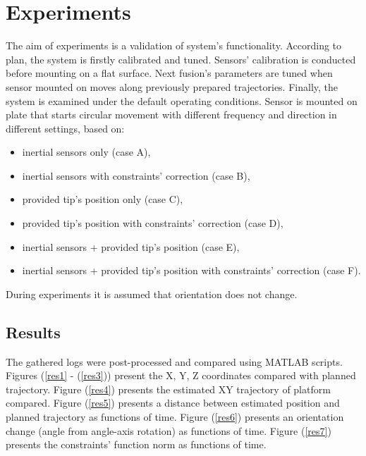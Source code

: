 \chapter{Experiments}

The aim of experiments is a validation of system's functionality. According to plan, the system is firstly calibrated and tuned. Sensors' calibration is conducted before mounting on a flat surface. Next fusion's parameters are tuned when sensor mounted on  moves along previously prepared trajectories. Finally, the system is examined under the default operating conditions. Sensor is mounted on plate that starts circular movement with different frequency and direction in different settings, based on:
\begin{itemize}
	\item inertial sensors only (case A),
	\item inertial sensors with constraints' correction (case B),
	\item provided tip's position only (case C),
	\item provided tip's position with constraints' correction (case D),
	\item inertial sensors + provided tip's position (case E),
	\item inertial sensors + provided tip's position with constraints' correction (case F).
\end{itemize}

During experiments it is assumed that orientation does not change.


\section{Results}

The gathered logs were post-processed and compared using MATLAB scripts. Figures (\ref{res1} - (\ref{res3})) present the X, Y, Z coordinates compared with planned trajectory. Figure (\ref{res4}) presents the estimated XY trajectory of platform compared.
Figure (\ref{res5}) presents a distance between estimated position and planned trajectory as functions of time. Figure (\ref{res6}) presents an orientation change (angle from angle-axis rotation) as functions of time. Figure (\ref{res7}) presents the constraints' function norm as functions of time.

